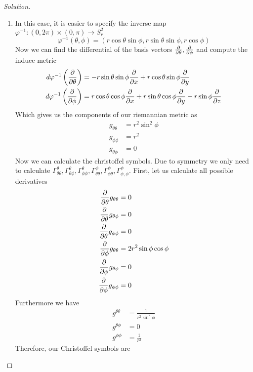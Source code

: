 \documentclass[a4paper]{article}
\begin{document}
\begin{proof}[Solution]
  \begin{enumerate}
    \item In this case, it is easier to specify the inverse map $\varphi^{-1}: (0, 2\pi) \times (0, \pi) \rightarrow S_r^2$
      \[
        \varphi^{-1}(\theta, \phi) = (r \cos \theta \sin \phi, r \sin \theta \sin \phi, r \cos \phi)
      \]
  Now we can find the differential of the basis vectors $ \pdv{\theta}, \pdv{\phi}$ and compute the induce metric
  \[
    \begin{aligned}
      d\varphi^{-1} \left( \pdv{\theta} \right) &= -r \sin \theta \sin \phi \pdv{x} + r \cos \theta \sin \phi \pdv{y} \\
      d \varphi^{-1} \left( \pdv{\phi} \right) &= r \cos \theta \cos \phi \pdv{x} + r \sin \theta \cos \phi \pdv{y} - r \sin \phi \pdv{z}
    \end{aligned}
  \]
  Which gives us the components of our riemannian metric as
  \[
    \begin{aligned}
      g_{\theta \theta} &= r^2\sin^2 \phi \\
      g_{\phi \phi} &= r^2  \\
      g_{\theta \phi} &= 0
    \end{aligned}
  \]
  Now we can calculate the christoffel symbols. Due to symmetry we only need to calculate $\Gamma_{\theta \theta}^\theta, \Gamma_{\theta \phi}^\theta, \Gamma_{\phi \phi}^\theta, \Gamma_{\theta \theta}^\phi, \Gamma_{\phi \theta}^{\phi}, \Gamma_{\phi, \phi}^\phi$. First, let us calculate all possible derivatives
  \[
    \begin{aligned}
      \pdv{\theta} g_{\theta \theta} &= 0 \\
      \pdv{\theta} g_{\theta \phi} &= 0 \\
      \pdv{\theta} g_{\phi \phi} &= 0 \\
      \pdv{\phi} g_{\theta \theta} &= 2r^2 \sin \phi \cos \phi \\
      \pdv{\phi} g_{\theta \phi} &= 0 \\
      \pdv{\phi} g_{\phi \phi} &= 0
    \end{aligned}
  \]
  Furthermore we have
  \[
    \begin{aligned}
      g^{\theta \theta} &= \frac{1}{r^2 \sin^2 \phi} \\
      g^{\theta \phi} &= 0 \\
      g^{\phi \phi} &= \frac{1}{r^2}
    \end{aligned}
  \]
  Therefore, our Christoffel symbols are

\end{enumerate}
\end{proof}
\end{document}
